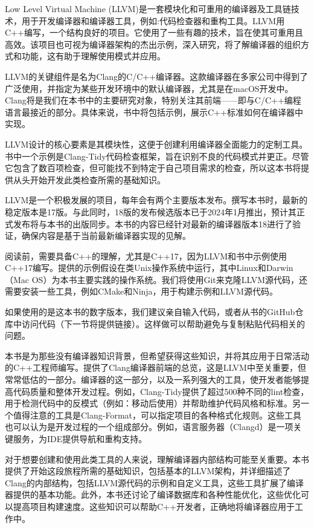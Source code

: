Low Level Virtual Machine (LLVM)是一套模块化和可重用的编译器及工具链技术，用于开发编译器和编译器工具，例如:代码检查器和重构工具。LLVM用C++编写，一个结构良好的项目。它使用了一些有趣的技术，旨在使其可重用且高效。该项目也可视为编译器架构的杰出示例，深入研究，将了解编译器的组织方式和功能，这有助于理解使用模式并应用。

LLVM的关键组件是名为Clang的C/C++编译器。这款编译器在多家公司中得到了广泛使用，并指定为某些开发环境中的默认编译器，尤其是在macOS开发中。Clang将是我们在本书中的主要研究对象，特别关注其前端——即与C/C++编程语言最接近的部分。具体来说，书中将包括示例，展示C++标准如何在编译器中实现。

LLVM设计的核心要素是其模块性，这便于创建利用编译器全面能力的定制工具。书中一个示例是Clang-Tidy代码检查框架，旨在识别不良的代码模式并更正。尽管它包含了数百项检查，但可能找不到特定于自己项目需求的检查，所以这本书将提供从头开始开发此类检查所需的基础知识。

LLVM是一个积极发展的项目，每年会有两个主要版本发布。撰写本书时，最新的稳定版本是17版。与此同时，18版的发布候选版本已于2024年1月推出，预计其正式发布将与本书的出版同步。本书的内容已经针对最新的编译器版本18进行了验证，确保内容是基于当前最新编译器实现的见解。


阅读前，需要具备C++的理解，尤其是C++17，因为LLVM和书中示例使用C++17编写。提供的示例假设在类Unix操作系统中运行，其中Linux和Darwin（Mac OS）为本书主要实践的操作系统。我们将使用Git来克隆LLVM源代码，还需要安装一些工具，例如CMake和Ninja，用于构建示例和LLVM源代码。

如果使用的是这本书的数字版本，我们建议亲自输入代码，或者从书的GitHub仓库中访问代码（下一节将提供链接）。这样做可以帮助避免与复制粘贴代码相关的问题。


本书是为那些没有编译器知识背景，但希望获得这些知识，并将其应用于日常活动的C++工程师编写。提供了Clang编译器前端的总览，这是LLVM中至关重要，但常常低估的一部分。编译器的这一部分，以及一系列强大的工具，使开发者能够提高代码质量和整体开发过程。例如，Clang-Tidy提供了超过500种不同的lint检查，用于检测代码中的反模式（例如：移动后使用）并帮助维护代码风格和标准。另一个值得注意的工具是Clang-Format，可以指定项目的各种格式化规则。这些工具也可以认为是开发过程的一个组成部分。例如，语言服务器（Clangd）是一项关键服务，为IDE提供导航和重构支持。

对于想要创建和使用此类工具的人来说，理解编译器内部结构可能至关重要。本书提供了开始这段旅程所需的基础知识，包括基本的LLVM架构，并详细描述了Clang的内部结构，包括LLVM源代码的示例和自定义工具，这些工具扩展了编译器提供的基本功能。此外，本书还讨论了编译数据库和各种性能优化，这些优化可以提高项目构建速度。这些知识可以帮助C++开发者，正确地将编译器应用于工作中。

